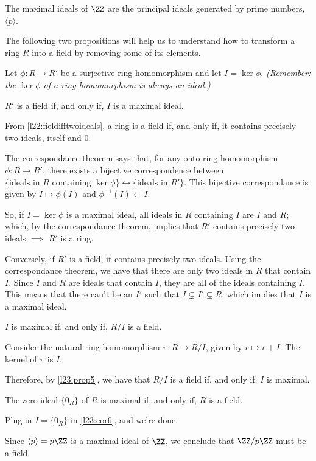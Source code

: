 \begin{exmp}
	The maximal ideals of $\ZZ$ are the principal ideals generated by prime numbers, $ \langle p \rangle$.
\end{exmp}

The following two propositions will help us to understand how to transform a ring $R$ into a field by removing some of its elements.

\begin{prop}\label{l23:prop5}
	Let $\phi: R \to R'$ be a surjective ring homomorphism and let $I = \ker \phi$. \emph{(Remember: the $\ker\phi$ of a ring homomorphism is always an ideal.)} 

	$R'$ is a field if, and only if, $I$ is a maximal ideal.
\end{prop}
\begin{dem}
	From \cref{l22:fieldifftwoideals}, a ring is a field if, and only if, it contains precisely two ideals, itself and ${0}$.
	
	The correspondance theorem says that, for any onto ring homomorphism $\phi: R \to R'$, there exists a bijective correspondence between $\{\text{ideals in $R$ containing $\ker\phi$}\} \leftrightarrow \{\text{ideals in $R'$}\}$.
	This bijective correspondance is given by $I \mapsto \phi(I)$ and $\phi^{-1}(I) \mapsfrom I$.

	So, if $I = \ker\phi$ is a maximal ideal, all ideals in $R$ containing $I$ are $I$ and $R$; which, by the correspondance theorem, implies that $R'$ contains precisely two ideals $\implies$ $R'$ is a ring.

	Conversely, if $R'$ is a field, it contains precisely two ideals. Using the correspondance theorem, we have that there are only two ideals in $R$ that contain $I$. Since $I$ and $R$ are ideals that contain $I$, they are all of the ideals containing $I$. This means that there can't be an $I'$ such that $I \subsetneq I' \subsetneq R$, which implies that $I$ is a maximal ideal.
\end{dem}
\begin{cor}\label{l23:cor6}
	$I$ is maximal if, and only if, $R/I$ is a field.
\end{cor}
\begin{dem}
	Consider the natural ring homomorphism $\pi: R \to R/I$, given by $r \mapsto r + I$. The kernel of $\pi$ is $I$.

	Therefore, by \cref{l23:prop5}, we have that $R/I$ is a field if, and only if, $I$ is maximal.
\end{dem}
\begin{cor}
	The zero ideal $\{0_R\}$ of  $R$ is maximal if, and only if, $R$ is a field.
\end{cor}
\begin{dem}
	Plug in $I = \{0_R\}$ in \cref{l23:cor6}, and we're done.
\end{dem}

\begin{exmp}
	Since $ \langle p \rangle = p\ZZ$ is a maximal ideal of $\ZZ$, we conclude that $\ZZ/p\ZZ$ must be a field.
\end{exmp}
